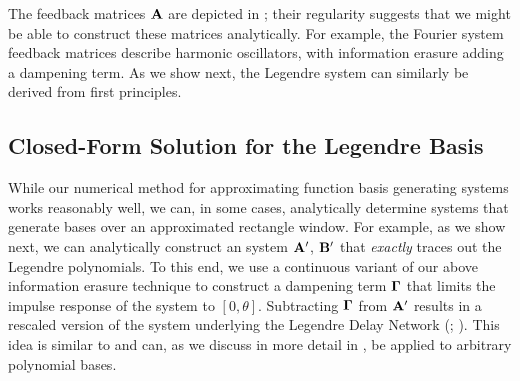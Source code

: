 The feedback matrices $\mathbf{A}$ are depicted in ; their regularity suggests that we might be able to construct these matrices analytically.
For example, the Fourier system feedback matrices describe harmonic oscillators, with information erasure adding a dampening term.
As we show next, the Legendre system can similarly be derived from first principles.

\subsection{Closed-Form Solution for the Legendre Basis}
\label{sec:ldn_derivation}

While our numerical method for approximating function basis generating \LTI systems works reasonably well, we can, in some cases, analytically determine \LTI systems that generate bases over an approximated rectangle window.
For example, as we show next, we can analytically construct an \LTI system ${\mathbf{A}}'$, ${\mathbf{B}}'$ that \emph{exactly} traces out the Legendre polynomials.
To this end, we use a continuous variant of our above information erasure technique to construct a dampening term $\mathbf{\Gamma}$ that limits the impulse response of the system to $[0, \theta]$.
Subtracting $\mathbf{\Gamma}$ from $\mathbf{A}'$ results in a rescaled version of the \LTI system underlying the Legendre Delay Network (\LDN; \cite{voelker2018improving}).
This idea is similar to \citet{gu2020hippo} and can, as we discuss in more detail in \citet{stockel2021constructing}, be applied to arbitrary polynomial bases.

